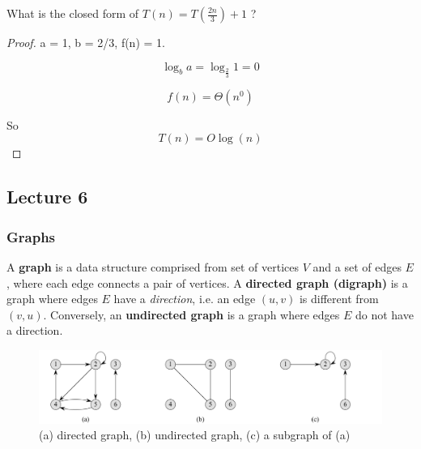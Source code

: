 \documentclass[../notes.tex]{subfiles}
\begin{document}
\begin{example}

	What is the closed form of $T(n) = T(\frac{2n}{3}) + 1$ ?

	\begin{proof}
		a = 1, b = 2/3, f(n) = 1.

		\begin{equation}
			\log_ba = \log_{\frac{2}{3}} 1 = 0 
		\end{equation}

		\begin{equation}
			f(n) = \Theta(n^0)
		\end{equation}

		So
		\begin{equation}
			T(n) = O\log(n)
		\end{equation}
		
	\end{proof}
	


	
\end{example}








\subsection{Lecture 6}

\subsubsection{Graphs}

\begin{definition}
A \textbf{graph} is a data structure comprised from set of vertices $ V $ and a set of edges $ E $, where each edge connects a pair of vertices.
A \textbf{directed graph (digraph)} is a graph where edges $ E $ have a \textit{direction}, i.e. an edge $ (u,v) $ is different from $ (v,u) $.
Conversely, an \textbf{undirected graph} is a graph where edges $ E $ do not have a direction.
\begin{figure}[H]
	\centering
	\includegraphics[width=0.8\linewidth]{img/image_2022-09-22-00-05-04.png}
	\caption{(a) directed graph, (b) undirected graph, (c) a subgraph of (a)}
\end{figure}

\end{definition}
\end{document}
